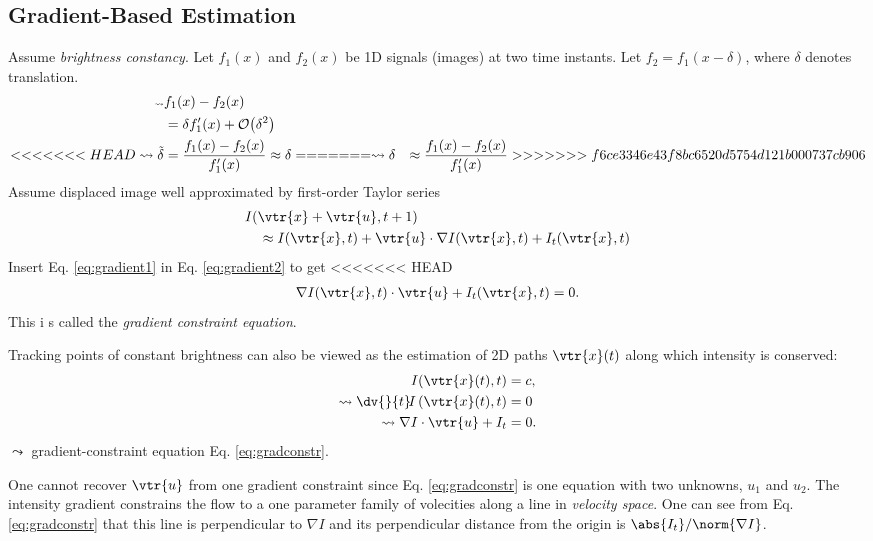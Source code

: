 \begin{compactdesc}
\section{Gradient-Based Estimation}
Assume \emph{brightness constancy}. Let $f_1(x)$ and $f_2(x)$ be 1D signals (images) at two time instants. Let $f_2=f_1(x-\delta)$, where $\delta$ denotes translation.
\begin{align}\scriptscriptstyle
	\mkern-36mu\leadsto &f_1(x)-f_2(x)\nonumber\\
	&=\delta f_1'(x)+\mathcal{O}\!\left( \delta^2 \right)\nonumber\\
<<<<<<< HEAD
	\leadsto \tilde{\delta} &=\frac{f_1(x)-f_2(x)}{f_1'(x)}\approx \delta
=======
	\leadsto \delta &\approx\frac{f_1(x)-f_2(x)}{f_1'(x)}
>>>>>>> f6ce3346e43f8bc6520d5754d121b000737cb906
	\label{eq:gradient1}
\end{align}
Assume displaced image well approximated by first-order Taylor series
\begin{align}
		&I\!\left( \vtr{x}+\vtr{u},t+1 \right)
	\label{eq:gradient2}\\
		&\quad\approx I(\vtr{x},t)+\vtr{u}\cdot \nabla I(\vtr{x},t)+I_t(\vtr{x},t)\nonumber
\end{align}
Insert Eq. \ref{eq:gradient1} in Eq. \ref{eq:gradient2} to get
<<<<<<< HEAD
\begin{gather}
	\nabla I(\vtr{x},t)\cdot\vtr{u}+I_t(\vtr{x},t)=0.
	\label{eq:gradconstr}
\end{gather}
This i s called the \emph{gradient constraint equation}.
\item[\lp{Intensity Conservation}] Tracking points of constant brightness can also be viewed as the estimation of 2D paths $\vtr{x}(t)$ along which intensity is conserved:
	\begin{align}
		I\!\left( \vtr{x}(t),t \right)&=c,\nonumber\\
		\leadsto\dv{}{t}\!I\left( \vtr{x}(t),t \right)&=0\nonumber\\
		\leadsto\nabla I\cdot \vtr{u}+I_t&=0.
		\label{eq:brightnessconst3}
	\end{align}
	$\leadsto$ gradient-constraint equation Eq. \ref{eq:gradconstr}.
\item[\lp{Least-Squares estimation}] One cannot recover $\vtr{u}$ from one gradient constraint since Eq. \ref{eq:gradconstr}  is one equation with two unknowns, $u_1$ and $u_2$. The intensity gradient constrains the flow to a one parameter family of volecities along a line in \emph{velocity space}. One can see from Eq. \ref{eq:gradconstr} that this line is perpendicular to $\nabla I$ and its perpendicular distance from the origin is $\abs{I_t}/\norm{\nabla I}$.


\end{compactdesc}
